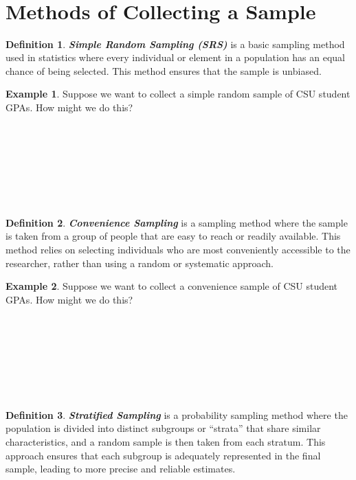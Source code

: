 \documentclass[
  11pt,
  oneside]{book}
\theoremstyle{definition}
\newtheorem{definition}{Definition}[chapter]
\theoremstyle{definition}
\newtheorem{example}{Example}[chapter]
\theoremstyle{definition}
\theoremstyle{definition}
\theoremstyle{remark}
\begin{document}
\(~\)

\(~\)

\(~\)

\(~\)

\section{Methods of Collecting a Sample}\label{methods-of-collecting-a-sample}

\begin{definition}
\textbf{\emph{Simple Random Sampling (SRS)}} is a basic sampling method used in statistics where every individual or element in a population has an equal chance of being selected. This method ensures that the sample is unbiased.
\end{definition}

\begin{example}
Suppose we want to collect a simple random sample of CSU student GPAs. How might we do this?
\end{example}

\(~\)

\(~\)

\(~\)

\(~\)

\begin{definition}
\textbf{\emph{Convenience Sampling}} is a sampling method where the sample is taken from a group of people that are easy to reach or readily available. This method relies on selecting individuals who are most conveniently accessible to the researcher, rather than using a random or systematic approach.
\end{definition}

\begin{example}
Suppose we want to collect a convenience sample of CSU student GPAs. How might we do this?
\end{example}

\(~\)

\(~\)

\(~\)

\(~\)

\begin{definition}
\textbf{\emph{Stratified Sampling}} is a probability sampling method where the population is divided into distinct subgroups or ``strata'' that share similar characteristics, and a random sample is then taken from each stratum. This approach ensures that each subgroup is adequately represented in the final sample, leading to more precise and reliable estimates.
\end{definition}
\end{document}
